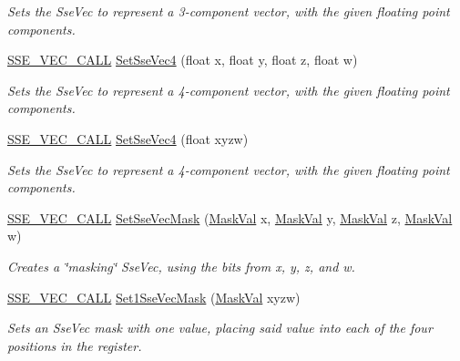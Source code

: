 \begin{DoxyCompactItemize}
\begin{DoxyCompactList}\small\item\em Sets the Sse\+Vec to represent a 3-\/component vector, with the given floating point components. \end{DoxyCompactList}\item 
\hyperlink{ssevec__math__defs_8h_a97454f977a5281455cecacce1e8ba670}{S\+S\+E\+\_\+\+V\+E\+C\+\_\+\+C\+A\+L\+L} \hyperlink{namespacegfxmath_a3b21a4362c6ac781c5f6ab922840ba77}{Set\+Sse\+Vec4} (float x, float y, float z, float w)
\begin{DoxyCompactList}\small\item\em Sets the Sse\+Vec to represent a 4-\/component vector, with the given floating point components. \end{DoxyCompactList}\item 
\hyperlink{ssevec__math__defs_8h_a97454f977a5281455cecacce1e8ba670}{S\+S\+E\+\_\+\+V\+E\+C\+\_\+\+C\+A\+L\+L} \hyperlink{namespacegfxmath_a8ceb1c8310eb6cbeec062c9a2d73322e}{Set\+Sse\+Vec4} (float xyzw)
\begin{DoxyCompactList}\small\item\em Sets the Sse\+Vec to represent a 4-\/component vector, with the given floating point components. \end{DoxyCompactList}\item 
\hyperlink{ssevec__math__defs_8h_a97454f977a5281455cecacce1e8ba670}{S\+S\+E\+\_\+\+V\+E\+C\+\_\+\+C\+A\+L\+L} \hyperlink{namespacegfxmath_ae6fdce7b817a9d0caea6a71c5a377bbb}{Set\+Sse\+Vec\+Mask} (\hyperlink{group___scalar_math_consts_gad991473bd51363f9743013730e68751a}{Mask\+Val} x, \hyperlink{group___scalar_math_consts_gad991473bd51363f9743013730e68751a}{Mask\+Val} y, \hyperlink{group___scalar_math_consts_gad991473bd51363f9743013730e68751a}{Mask\+Val} z, \hyperlink{group___scalar_math_consts_gad991473bd51363f9743013730e68751a}{Mask\+Val} w)
\begin{DoxyCompactList}\small\item\em Creates a \char`\"{}masking\char`\"{} Sse\+Vec, using the bits from x, y, z, and w. \end{DoxyCompactList}\item 
\hyperlink{ssevec__math__defs_8h_a97454f977a5281455cecacce1e8ba670}{S\+S\+E\+\_\+\+V\+E\+C\+\_\+\+C\+A\+L\+L} \hyperlink{namespacegfxmath_a6afdd3908c46c824484904fc028bac61}{Set1\+Sse\+Vec\+Mask} (\hyperlink{group___scalar_math_consts_gad991473bd51363f9743013730e68751a}{Mask\+Val} xyzw)
\begin{DoxyCompactList}\small\item\em Sets an Sse\+Vec mask with one value, placing said value into each of the four positions in the register. \end{DoxyCompactList}\end{DoxyCompactItemize}


